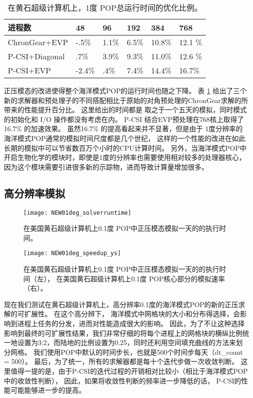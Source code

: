 \begin{table}[!h]
\begin{center}
\caption{在黄石超级计算机上，1度 POP总运行时间的优化比例。 \label{tab:improve_1}}
\begin{tabular}{|l||l|l|l|l|l|}
\hline
进程数 & 48  & 96  & 192 & 384 & 768\\\hline
\hline
ChronGear+EVP & -.5\% & 1.1\%  & 6.5\% & 10.8\%  & 12.1 \% \\\hline
P-CSI+Diagonal  & .7\% &3.9\% &9.3\%  &11.0\% & 12.6 \% \\\hline
P-CSI+EVP	      &-2.4\% & .4\%	& 7.4\%  & 14.4\% & 16.7\%\\\hline
\end{tabular}
\end{center}
\end{table}


正压模态的改进使得整个海洋模式POP的运行时间也随之下降。
表 \ref{tab:improve_1} 给出了三个新的求解器和预处理子的不同搭配相比于原始的对角预处理的ChronGear求解的所带来的性能提升百分比。 
这里给出的时间都是 取之于一个五天的模拟，同时模式的初始化和 I/O 操作都没有考虑在内。 
P-CSI 结合EVP预处理在768核上取得了  16.7\% 的加速效果。
虽然16.7\% 的提高看起来并不显著，但是由于 1度分辨率的海洋模式POP通常的模拟时间尺度都是几个世纪， 这样的一个性能的改进在如此长期的模拟中可以节省数百万个小时的CPU计算时间。 
另外，当海洋模式POP中开启生物化学的模块时，即使是1度的分辨率也需要使用相对较多的处理器核心，因为这个模块需要引进很多新的示踪物，进而导致计算量增加很多。 

\subsection{高分辨率模拟}
\label{precond:exp:high}

\begin {figure}
\centering
\texttt{[image: NEW01deg\_solverruntime]}
\caption []{ 在美国黄石超级计算机上0.1度 POP中正压模态模拟一天的的执行时间。\label {fig:runtime01_time}}
\end {figure}

\begin {figure}
\centering
\texttt{[image: NEW01deg\_speedup\_ys]}
\caption []{ 在美国黄石超级计算机上0.1度 POP中正压模态模拟一天的的执行时间（左）， 
在美国黄石超级计算机上0.1度 POP核心部分的模拟速率（右）。\label {fig:runtime01_rate}}
\end {figure}


现在我们测试在黄石超级计算机上，高分辨率0.1度的海洋模式POP的新的正压求解的可扩展性。 
在这个高分辨下， 海洋模式中网格块的大小和分布得选择，会影响到进程上任务的分发，进而对性能造成很大的影响。 
因此，为了不让这种选择影响到最终的可扩展性结果，我们非常仔细的将每个进程上的网格块的横纵比例统一地设置为3:2，而陆地的比例设置为0.25，同时还利用空间填充曲线的方法来划分网格。 
我们使用POP中默认的时间步长，也就是500个时间步每天（dt\_count = 500）。 
最后，为了统一，所有的求解器都是每十个迭代步做一次收敛判断。 
这里值得一提的是，由于P-CSI的迭代过程的开销相对比较小（相比于海洋模式POP中的收敛性判断）， 因此，如果将收敛性判断的频率进一步降低的话， P-CSI的性能可能能够进一步的提高。 
 

